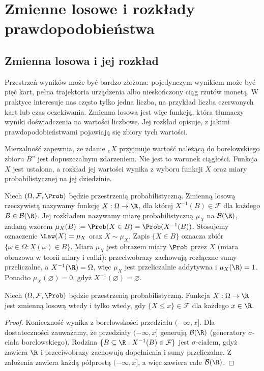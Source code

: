 \chapter{Zmienne losowe i rozkłady prawdopodobieństwa}
\label{ch:random-variables}

\providecommand{\atlasref}[2]{#2}

\section{Zmienna losowa i jej rozkład}
Przestrzeń wyników może być bardzo złożona: pojedynczym wynikiem
może być pięć kart, pełna trajektoria urządzenia albo nieskończony
ciąg rzutów monetą. W praktyce interesuje nas często tylko jedna
liczba, na przykład liczba czerwonych kart lub czas oczekiwania.
Zmienna losowa jest więc funkcją, która tłumaczy wyniki doświadczenia
na wartości liczbowe. Jej rozkład opisuje, z jakimi
prawdopodobieństwami pojawiają się zbiory tych wartości.

Mierzalność zapewnia, że zdanie „$X$ przyjmuje wartość należącą
do borelowskiego zbioru $B$” jest dopuszczalnym zdarzeniem.
Nie jest to warunek ciągłości. Funkcja $X$ jest ustalona,
a rozkład jej wartości wynika z wyboru funkcji $X$ oraz
miary probabilistycznej na jej dziedzinie.

\begin{definicja}
Niech $(\Omega,\mathcal F,\Prob)$ będzie przestrzenią probabilistyczną.
Zmienną losową rzeczywistą nazywamy funkcję
$X:\Omega\to\R$, dla której $X^{-1}(B)\in\mathcal F$
dla każdego $B\in\mathcal B(\R)$. Jej rozkładem nazywamy miarę
probabilistyczną $\mu_X$ na $\mathcal B(\R)$, zadaną wzorem
$\mu_X(B):=\Prob(X\in B)=\Prob(X^{-1}(B))$.
Stosujemy oznaczenie $\Law(X)=\mu_X$ oraz $X\sim\mu_X$.
Zapis $\{X\in B\}$ oznacza zbiór $\{\omega\in\Omega:X(\omega)\in B\}$.
Miara $\mu_X$ jest obrazem miary $\Prob$ przez $X$
(\atlasref{ME-02::def:pushforward}{miara obrazowa w teorii miary i całki}):
przeciwobrazy zachowują rozłączne sumy przeliczalne, a
$X^{-1}(\R)=\Omega$, więc $\mu_X$ jest przeliczalnie addytywna
i $\mu_X(\R)=1$. Ponadto $\mu_X(\varnothing)=0$,
gdyż $X^{-1}(\varnothing)=\varnothing$.
\end{definicja}

\begin{stwierdzenie}
Niech $(\Omega,\mathcal F,\Prob)$ będzie przestrzenią probabilistyczną.
Funkcja $X:\Omega\to\R$ jest zmienną losową wtedy i tylko wtedy,
gdy $\{X\leq x\}\in\mathcal F$ dla każdego $x\in\R$.
\end{stwierdzenie}
\begin{proof}
Konieczność wynika z borelowskości przedziału $(-\infty,x]$.
Dla dostateczności zauważamy, że przedziały $(-\infty,x]$ generują
$\mathcal B(\R)$
(\atlasref{ME-01::thm:borel-generators-R}{generatory $\sigma$-ciała borelowskiego}).
Rodzina $\{B\subseteq\R:X^{-1}(B)\in\mathcal F\}$
jest $\sigma$-ciałem, gdyż zawiera $\R$ i przeciwobrazy
zachowują dopełnienia i sumy przeliczalne. Z założenia zawiera
każdą półprostą $(-\infty,x]$, a więc zawiera całe $\mathcal B(\R)$.
\end{proof}

